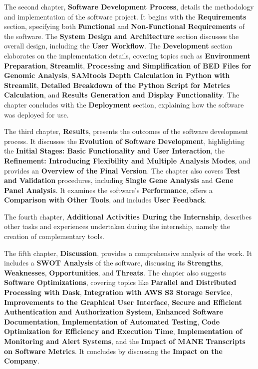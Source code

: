The second chapter, \textbf{Software Development Process}, details the methodology and implementation of the software project. It begins with the \textbf{Requirements} section, specifying both \textbf{Functional} and \textbf{Non-Functional Requirements} of the software. The \textbf{System Design and Architecture} section discusses the overall design, including the \textbf{User Workflow}. The \textbf{Development} section elaborates on the implementation details, covering topics such as \textbf{Environment Preparation}, \textbf{Streamlit}, \textbf{Processing and Simplification of BED Files for Genomic Analysis}, \textbf{SAMtools Depth Calculation in Python with Streamlit}, \textbf{Detailed Breakdown of the Python Script for Metrics Calculation}, and \textbf{Results Generation and Display Functionality}. The chapter concludes with the \textbf{Deployment} section, explaining how the software was deployed for use.

The third chapter, \textbf{Results}, presents the outcomes of the software development process. It discusses the \textbf{Evolution of Software Development}, highlighting the \textbf{Initial Stages: Basic Functionality and User Interaction}, the \textbf{Refinement: Introducing Flexibility and Multiple Analysis Modes}, and provides an \textbf{Overview of the Final Version}. The chapter also covers \textbf{Test and Validation} procedures, including \textbf{Single Gene Analysis} and \textbf{Gene Panel Analysis}. It examines the software's \textbf{Performance}, offers a \textbf{Comparison with Other Tools}, and includes \textbf{User Feedback}.

The fourth chapter, \textbf{Additional Activities During the Internship}, describes other tasks and experiences undertaken during the internship, namely the creation of complementary tools.

The fifth chapter, \textbf{Discussion}, provides a comprehensive analysis of the work. It includes a \textbf{SWOT Analysis} of the software, discussing its \textbf{Strengths}, \textbf{Weaknesses}, \textbf{Opportunities}, and \textbf{Threats}. The chapter also suggests \textbf{Software Optimizations}, covering topics like \textbf{Parallel and Distributed Processing with Dask}, \textbf{Integration with AWS S3 Storage Service}, \textbf{Improvements to the Graphical User Interface}, \textbf{Secure and Efficient Authentication and Authorization System}, \textbf{Enhanced Software Documentation}, \textbf{Implementation of Automated Testing}, \textbf{Code Optimization for Efficiency and Execution Time}, \textbf{Implementation of Monitoring and Alert Systems}, and the \textbf{Impact of MANE Transcripts on Software Metrics}. It concludes by discussing the \textbf{Impact on the Company}.

